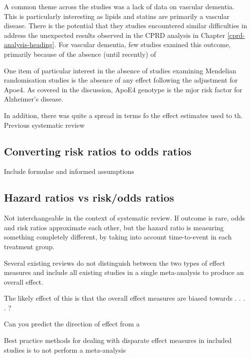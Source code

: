 \documentclass[a4paper, twoside]{templates/ociamthesis}
\begin{document}
A common theme across the studies was a lack of data on vascular dementia. This is particularly interesting as lipids and statins are primarily a vascular disease. There is the potential that they studies encountered similar difficulties in address the unexpected results observed in the CPRD analysis in Chapter \ref{cprd-analysis-heading}. For vascular dementia, few studies exmined this outcome, primarily because of the absence (until recently) of

One item of particular interest in the absence of studies examining Mendelian randomisation studies is the absence of any effect following the adjustment for Apoe4. As covered in the discussion, ApoE4 genotype is the mjor risk factor for Alzheimer's disease.

In addition, there was quite a spread in terms fo the effect estimates used to th. Previous systematic review

\hypertarget{converting-risk-ratios-to-odds-ratios}{%
\subsection{Converting risk ratios to odds ratios}\label{converting-risk-ratios-to-odds-ratios}}

Include formulae and informed assumptions

\hypertarget{hazard-ratios-vs-riskodds-ratios}{%
\subsection{Hazard ratios vs risk/odds ratios}\label{hazard-ratios-vs-riskodds-ratios}}

Not interchangeable in the context of systematic review. If outcome is rare, odds and risk ratios approximate each other, but the hazard ratio is measuring something completely different, by taking into account time-to-event in each treatment group.

Several existing reviews do not distinguish between the two types of effect measures and include all existing studies in a single meta-analysis to produce an overall effect.

The likely effect of this is that the overall effect measures are biased towards . . . . ?

Can you predict the direction of effect from a

Best practice methods for dealing with disparate effect measures in included studies is to not perform a meta-analysis
\end{document}
